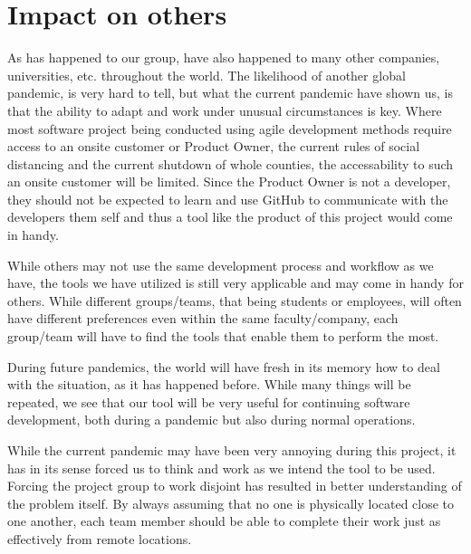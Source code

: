 \section{Impact on others}
As has happened to our group, have also happened to many other companies, universities, etc. throughout the world.
The likelihood of another global pandemic, is very hard to tell, but what the current pandemic have shown us, is that the ability to adapt and work under unusual circumstances is key.
Where most software project being conducted using agile development methods require access to an onsite customer or Product Owner, the current rules of social distancing and the current shutdown of whole counties, the accessability to such an onsite customer will be limited.
Since the Product Owner is not a developer, they should not be expected to learn and use GitHub to communicate with the developers them self and thus a tool like the product of this project would come in handy.

While others may not use the same development process and workflow as we have, the tools we have utilized is still very applicable and may come in handy for others.
While different groups/teams, that being students or employees, will often have different preferences even within the same faculty/company, each group/team will have to find the tools that enable them to perform the most.

During future pandemics, the world will have fresh in its memory how to deal with the situation, as it has happened before.
While many things will be repeated, we see that our tool will be very useful for continuing software development, both during a pandemic but also during normal operations.

While the current pandemic may have been very annoying during this project, it has in its sense forced us to think and work as we intend the tool to be used.
Forcing the project group to work disjoint has resulted in better understanding of the problem itself.
By always assuming that no one is physically located close to one another, each team member should be able to complete their work just as effectively from remote locations.